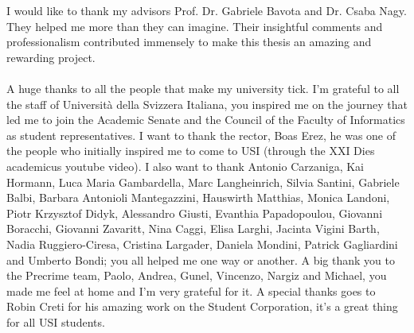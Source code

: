 \documentclass[11pt, mscthesis]{usiinfthesis}
\begin{document}
\begin{abstract}


\end{abstract}


\begin{acknowledgements}
I would like to thank my advisors Prof. Dr. Gabriele Bavota and Dr. Csaba Nagy. They helped me more than they can imagine. Their insightful comments and professionalism contributed immensely to make this thesis an amazing and rewarding project.
\\
\\
A huge thanks to all the people that make my university tick. I'm grateful to all the staff of Universit\`a della Svizzera Italiana, you inspired me on the journey that led me to join the Academic Senate and the Council of the Faculty of Informatics as student representatives. I want to thank the rector, Boas Erez, he was one of the people who initially inspired me to come to USI (through the XXI Dies academicus youtube video). I also want to thank Antonio Carzaniga, Kai Hormann, Luca Maria Gambardella, Marc Langheinrich, Silvia Santini, Gabriele Balbi, Barbara Antonioli Mantegazzini, Hauswirth Matthias, Monica Landoni, Piotr Krzysztof Didyk, Alessandro Giusti, Evanthia Papadopoulou, Giovanni Boracchi, Giovanni Zavaritt, Nina Caggi, Elisa Larghi, Jacinta Vigini Barth, Nadia Ruggiero-Ciresa, Cristina Largader, Daniela Mondini, Patrick Gagliardini and Umberto Bondi; you all helped me one way or another. A big thank you to the Precrime team, Paolo, Andrea, Gunel, Vincenzo, Nargiz and Michael, you made me feel at home and I’m very grateful for it. A special thanks goes to Robin Creti for his amazing work on the Student Corporation, it’s a great thing for all USI students.


\end{acknowledgements}
\end{document}
